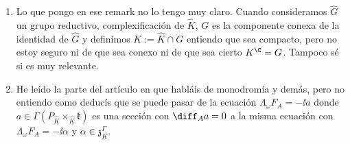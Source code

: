 {\begin{enumerate}
    \item[\textbf{(16)}] Lo que pongo en ese remark no lo tengo muy claro. Cuando consideramos \(\hat{G}\) un grupo reductivo, complexificación de \(\hat{K}\), \(G\) es la componente conexa de la identidad de \(\hat{G}\) y definimos \(K:=\hat{K}\cap G\) entiendo que sea compacto, pero no estoy seguro ni de que sea conexo ni de que sea cierto \(K^\C=G\). Tampoco sé si es muy relevante. 
    \item[\textbf{(17)}] He leído la parte del artículo en que habláis de monodromía y demás, pero no entiendo como deducís que se puede pasar de la ecuación \(\Lambda_\omega F_A=-\ii a\) donde \(a\in \Gamma(P_{\hat{K}} \times_{\hat{K}}\mathfrak{k})\) es una sección con \(\diff_A a=0\) a la misma ecuación con \(\Lambda_\omega F_A=-\ii \alpha\) y \(\alpha \in \mathfrak{z}^\Gamma_K\). 
\end{enumerate}
}
